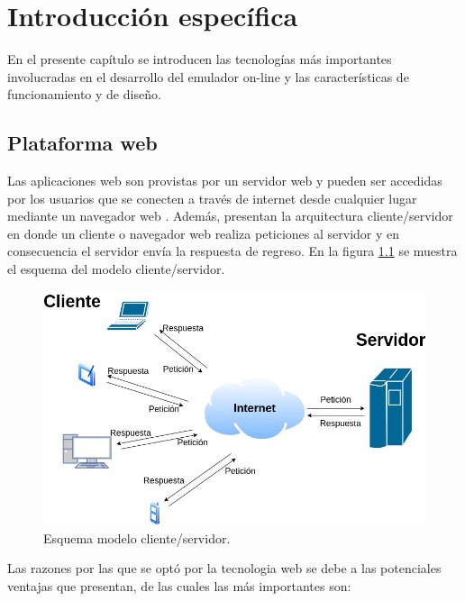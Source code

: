 \chapter{Introducción específica} %

\label{Chapter2}

En el presente capítulo se introducen las tecnologías más importantes involucradas en el desarrollo del emulador on-line y las características de funcionamiento y de diseño.

\section{Plataforma web}
\label{sec:Plataforma web}

Las aplicaciones web son provistas por un servidor web y pueden ser accedidas por los usuarios que se conecten a través de internet desde cualquier lugar mediante un navegador web \citep{NavegadorWeb}. Además, presentan la arquitectura cliente/servidor en donde un cliente o navegador web realiza peticiones al servidor y en consecuencia el servidor envía la respuesta de regreso. 
En la figura \ref{fig:ClienteServidor} se muestra el esquema del modelo cliente/servidor.

\begin{figure}[ht]
	\centering
	\includegraphics[scale=.45]{./Figures/EsquemaCliente_Servidor.jpg}
	\caption{Esquema modelo cliente/servidor.}
	\label{fig:ClienteServidor}
\end{figure}

Las razones por las que se optó por la tecnologia web se debe a las potenciales ventajas que presentan, de las cuales las más importantes son:

